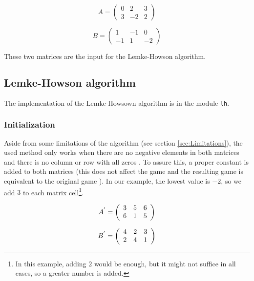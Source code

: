 \documentclass[a4paper,10pt]{article}
\begin{document}
\begin{minipage}[b]{0.5\linewidth}
	$$A = \left(
	\begin{array}{ccc}
	0 & 2 & 3 \\
	3 & -2 & 2
	\end{array}
	\right)$$
\end{minipage}
\begin{minipage}[b]{0.5\linewidth}
	$$B = \left(
	\begin{array}{ccc}
	1 & -1 & 0 \\
	-1 & 1 & -2
	\end{array}
	\right)$$
\end{minipage}

These two matrices are the input for the Lemke-Howson algorithm.

\subsection{Lemke-Howson algorithm}

The implementation of the Lemke-Howsown algorithm is in the module \texttt{lh}.

\subsubsection{Initialization}

Aside from some limitations of the algorithm (see section
\ref{sec:Limitations}), the used method only works when there are no negative
elements in both matrices and there is no column or row with all zeros
\cite{Pritchard08}. To assure this, a proper constant is added to both matrices
(this does not affect the game and the resulting game is equivalent to the
original game \cite{Pritchard08}). In our example, the lowest value is $-2$, so
we add $3$ to each matrix cell\footnote{In this example, adding $2$ would be
enough, but it might not suffice in all cases, so a greater number is added.}.

\begin{minipage}[b]{0.5\linewidth}
	$$A^{'} = \left(
	\begin{array}{c c c}
	3 & 5 & 6 \\
	6 & 1 & 5
	\end{array}
	\right)$$
\end{minipage}
\begin{minipage}[b]{0.5\linewidth}
	$$B^{'} = \left(
	\begin{array}{c c c}
	4 & 2 & 3 \\
	2 & 4 & 1
	\end{array}
	\right)$$
\end{minipage}
\end{document}
